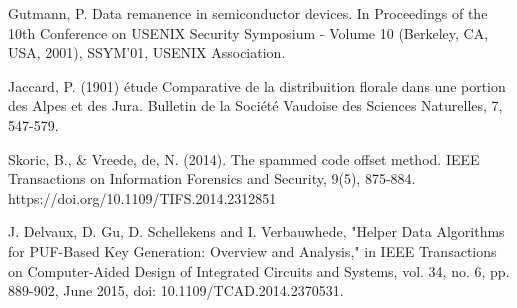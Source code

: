 \documentclass[journal, a4paper]{IEEEtran}
\begin{document}
\begin{thebibliography}{1}
    Gutmann, P. Data remanence in semiconductor devices. In Proceedings of the 10th Conference on USENIX Security Symposium - Volume 10 (Berkeley, CA, USA, 2001), SSYM’01, USENIX Association.

    Jaccard, P. (1901) étude Comparative de la distribuition florale dans une portion des Alpes et des Jura. Bulletin de la Société Vaudoise des Sciences Naturelles, 7, 547-579.

    Skoric, B., \& Vreede, de, N. (2014). The spammed code offset method. IEEE Transactions on Information Forensics and Security, 9(5), 875-884. https://doi.org/10.1109/TIFS.2014.2312851

    J. Delvaux, D. Gu, D. Schellekens and I. Verbauwhede, "Helper Data Algorithms for PUF-Based Key Generation: Overview and Analysis," in IEEE Transactions on Computer-Aided Design of Integrated Circuits and Systems, vol. 34, no. 6, pp. 889-902, June 2015, doi: 10.1109/TCAD.2014.2370531.

\end{thebibliography}

\end{document}
